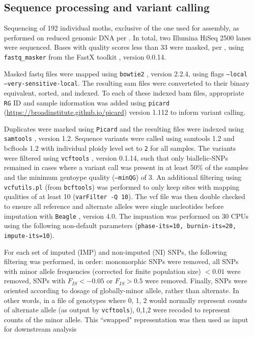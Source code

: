 \documentclass[fleqn,11pt]{wlpeerj}
\begin{document}
\subsection*{Sequence processing and variant calling} Sequencing of 192
individual moths, exclusive of the one used for assembly,  as performed on
reduced genomic DNA per \cite{PARCHMAN:2012ca}. In total, two  Illumina HiSeq
2500 lanes were sequenced. Bases with quality scores less than 33 were masked,
per \cite{Yun:2014dn},  using \texttt{fastq\_masker} from the FastX toolkit
\citep{citeulike:9103573}, version 0.0.14.

Masked fastq files were mapped using \texttt{bowtie2} \cite{Langmead:2012jh},
version 2.2.4, using flags \texttt{--local --very-sensitive-local}.  The
resulting  sam files were converteted to their binary equivalent, sorted, and
indexed. To each of these indexed bam files, appropriate \texttt{RG} ID and
sample information was added using \texttt{picard} \\
(\url{https://broadinstitute.github.io/picard}) version 1.112 to inform variant
calling.

Duplicates were marked using \texttt{Picard} and the resulting files were
indexed using \texttt{samtools} \citep{Li:2009ka}, version 1.2.  Sequence
variants were called using samtools 1.2 and bcftools 1.2 with individual  ploidy
level set to \texttt{2} for all samples.  The variants were filtered  using
\texttt{vcftools} \cite{Danecek:2011gz}, version 0.1.14, such that only
biallelic-SNPs remained in cases where a variant call was present in at least
50\% of the samples and the minimum gentoype quality (\texttt{--minQG}) of 3. An
additional filtering using \texttt{vcfutils.pl} (from \texttt{bcftools}) was
performed to only keep sites with mapping qualities of at least 10
(\texttt{varFilter -Q 10}). The vcf file was then double checked to ensure all
reference and alternate alleles were single nucleotides before imputation with
\texttt{Beagle} \citep{Browning:2007ge}, version 4.0.  The impuation was
performed on 30 CPUs using the following non-default parameters
(\texttt{phase-its=10, burnin-its=20, impute-its=10}).

For each set of imputed (IMP) and non-imputed (NI) SNPs, the following filtering
was performed, in order: monomorphic SNPs were removed, all SNPs with minor
allele frequencies (corrected for finite population size) $< 0.01$ were removed,
SNPs with $F_{IS} < -0.05$ or $F_{IS} > 0.5$ were removed.  Finally, SNPs were
oriented  according to dosage of globally-minor allele, rather than alternate.
In other words,  in a file of genotypes where 0, 1, 2 would normally represent
counts of alternate allele  (as output by \texttt{vcftools}), 0,1,2 were recoded
to represent counts of the  minor allele.  This ``swapped" representation was
then used as input for  downstream analysis
\end{document}
